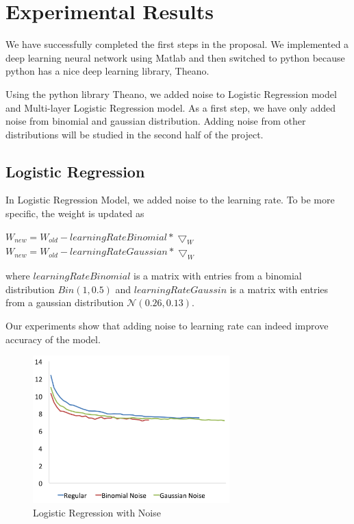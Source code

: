 \section{Experimental Results}
\label{sec:result}

We have successfully completed the first steps in the proposal.
We implemented a deep learning neural network using Matlab and then
switched to python because python has a nice deep learning library,
Theano.

Using the python library Theano, we added noise to Logistic Regression
model and Multi-layer Logistic Regression model.
As a first step, we have only added noise from binomial and gaussian
distribution. Adding noise from other distributions will be studied in
the second half of the project.

\subsection{Logistic Regression}
In Logistic Regression Model, we added noise to the learning rate.
To be more specific, the weight is updated as

\begin{center}
$W_{new} = W_{old} - learningRateBinomial * \bigtriangledown_{W}$
$W_{new} = W_{old} - learningRateGaussian * \bigtriangledown_{W}$
\end{center}

where $learningRateBinomial$ is a matrix with entries from a binomial
distribution $Bin(1,0.5)$ and $learningRateGaussin$ is a matrix with entries
from a gaussian distribution $\mathcal{N}(0.26,0.13)$.

Our experiments show that adding noise to learning rate can indeed
improve accuracy of the model.

\begin{figure}[h]
\centering
\includegraphics[width=215pt]{figs/logistic_sgd_all.png}
\caption{Logistic Regression with Noise}
\label{fig:logistic-sgd}
\end{figure}

